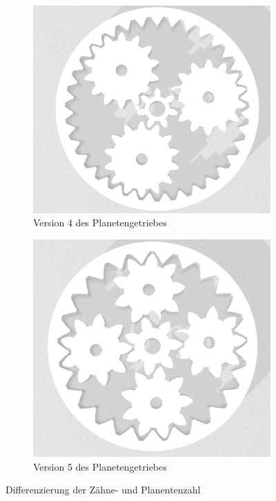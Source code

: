 \begin{figure}[!ht]
	\centering
	\begin{subfigure}[b]{0.4\textwidth}
		\includegraphics[width=\textwidth]{bilder/GetriebeVersion4-1.png}
		\caption{Version 4 des Planetengetriebes}
		\label{bild:gearversion4-1}
	\end{subfigure}
	\begin{subfigure}[b]{0.4\textwidth}
		\includegraphics[width=\textwidth]{bilder/GetriebeVersion4-2.png}
		\caption{Version 5 des Planetengetriebes}
		\label{bild:gearversion4-2}
	\end{subfigure}
	\caption{Differenzierung der Zähne- und Planentenzahl}
\end{figure}

